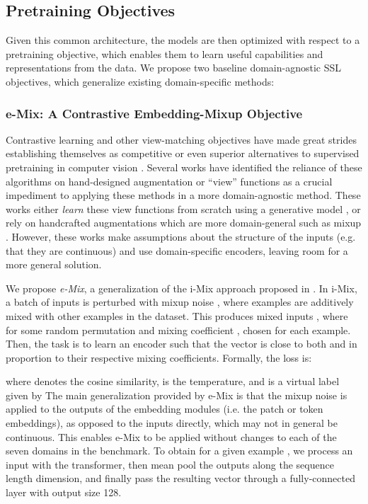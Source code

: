 \documentclass{article}
\begin{document}
\subsection{Pretraining Objectives}
Given this common architecture, the models are then optimized with respect to a pretraining objective, which enables them to learn useful capabilities and representations from the data. We propose two baseline domain-agnostic SSL objectives, which generalize existing domain-specific methods:

\subsubsection{e-Mix: A Contrastive Embedding-Mixup Objective}
Contrastive learning and other view-matching objectives have made great strides establishing themselves as competitive or even superior alternatives to supervised pretraining in computer vision \citep{Wu2018UnsupervisedFL, Chen2020ASF, He2020MomentumCF, Grill2020BootstrapYO}. Several works have identified the reliance of these algorithms on hand-designed augmentation or ``view'' functions as a crucial impediment to applying these methods in a more domain-agnostic method. These works either \emph{learn} these view functions from scratch using a generative model \citep{Tamkin2020ViewmakerNL}, or rely on handcrafted augmentations which are more domain-general such as mixup \citep{Lee2021iMIXAD, Verma2020TowardsDC}. However, these works make assumptions about the structure of the inputs (e.g. that they are continuous) and use domain-specific encoders, leaving room for a more general solution.

We propose \emph{e-Mix}, a generalization of the i-Mix approach proposed in \citet{Lee2021iMIXAD}. In i-Mix, a batch of inputs  is perturbed with mixup noise \citep{Zhang2018mixupBE}, where examples are additively mixed with other examples in the dataset. This produces mixed inputs , where  for some random permutation  and mixing coefficient , chosen for each example. Then, the task is to learn an encoder  such that the vector  is close to both  and  in proportion to their respective mixing coefficients. Formally, the loss is:

where  denotes the cosine similarity,  is the temperature, and  is a virtual label given by 
 The main generalization provided by e-Mix is that the mixup noise is applied to the outputs of the embedding modules (i.e. the patch or token embeddings), as opposed to the inputs directly, which may not in general be continuous. This enables e-Mix to be applied without changes to each of the seven domains in the benchmark. To obtain  for a given example , we process an input with the transformer, then mean pool the outputs along the sequence length dimension, and finally pass the resulting vector through a fully-connected layer with output size 128.
\end{document}
